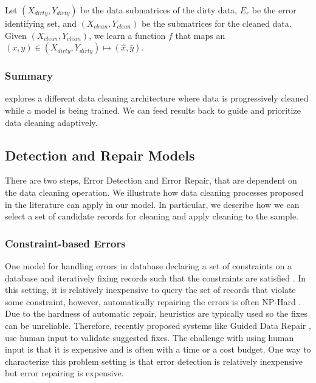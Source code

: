 \begin{problem}\label{imp-est}\sloppy
Let $(X_{dirty},Y_{dirty})$ be the data submatrices of the dirty data, $E_r$ be the error identifying set, and $(X_{clean},Y_{clean})$ be the submatrices for the cleaned data. Given $(X_{clean},Y_{clean})$, we learn a function $f$ that maps an $(x,y) \in (X_{dirty},Y_{dirty}) \mapsto (\hat{x},\hat{y})$.
\end{problem}

\subsubsection{Summary}
\sys explores a different data cleaning architecture where data is progressively cleaned while a model is being trained.
We can feed results back to guide and prioritize data cleaning adaptively.

\subsection{Detection and Repair Models}
There are two steps, Error Detection and Error Repair, that are dependent on the data cleaning operation. 
We illustrate how data cleaning processes proposed in the literature can apply in our model.
In particular, we describe how we can select a set of candidate records for cleaning and apply cleaning to the sample.

\subsubsection{Constraint-based Errors}
One model for handling errors in database declaring a set of constraints on a database and 
iteratively fixing records such that the constraints are satisfied \cite{DBLP:journals/pvldb/YakoutENOI11, DBLP:journals/pvldb/FanLMTY10, khayyat2015bigdansing}.
In this setting, it is relatively inexpensive to query the set of records that violate some constraint, however, automatically repairing the errors is often NP-Hard \cite{DBLP:journals/pvldb/FanLMTY10}.
Due to the hardness of automatic repair, heuristics are typically used so the fixes can be unreliable.
Therefore, recently proposed systems like Guided Data Repair \cite{DBLP:journals/pvldb/YakoutENOI11}, use human input to validate suggested fixes.
The challenge with using human input is that it is expensive and is often with a time or a cost budget.
One way to characterize this problem setting is that error detection is relatively inexpensive but error repairing is expensive.

